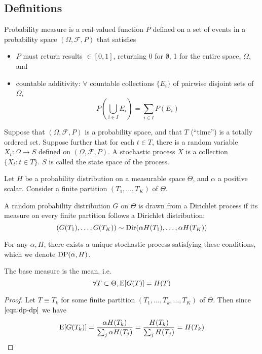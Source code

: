 \subsection{Definitions}
\begin{definition}
	Probability measure is a real-valued function $P$ defined on a set of events in a probability space $(\Omega, \mathcal F, P)$ that satisfies
	\begin{itemize}
		\item $P$ must return results $\in [0, 1]$, returning 0 for $\emptyset$, 1 for the entire space, $\Omega$, and
		\item countable additivity: $\forall$ countable collections $\{E_i\}$ of pairwise disjoint sets of $\Omega$,
			$$P\left(\bigcup_{i \in I} E_i\right) = \sum_{i \in I} P(E_i)$$
	\end{itemize}
\end{definition}

\begin{definition}
	Suppose that $(\Omega, \mathcal F, P)$ is a probability space, and that $T$ (``time'') is a totally ordered set. Suppose further that for each $t \in T$, there is a random variable $X_t: \Omega \to S$ defined on $(\Omega, \mathcal F, P)$. A stochastic process $X$ is a collection $\{X_t: t \in T\}$. $S$ is called the state space of the process.
\end{definition}

\begin{theorem}
	Let $H$ be a probability distribution on a measurable space $\Theta$, and $\alpha$ a positive scalar. Consider a finite partition $(T_1, \dotsc, T_K)$ of $\Theta$.

	A random probability distribution $G$ on $\Theta$ is drawn from a Dirichlet process if its measure on every finite partition follows a Dirichlet distribution:
	\begin{equation}
		(G(T_1), \dotsc, G(T_K)) \sim \operatorname{Dir}(\alpha H(T_1), \dotsc, \alpha H(T_K)) \label{eqn:dp-dp}
	\end{equation}

	For any $\alpha, H$, there exists a unique stochastic process satisfying these conditions, which we denote $\operatorname{DP}(\alpha, H)$.
\end{theorem}

\begin{claim}
	The base measure is the mean, i.e.
	\begin{equation}
		\forall T \subset \Theta, \operatorname{\mathrm{E}}[G(T)] = H(T) \label{eqn:np/dp/def/base}
	\end{equation}
\end{claim}

\begin{proof}
	Let $T \equiv T_k$ for some finite partition $(T_1, \dotsc, T_k, \dotsc, T_K)$ of $\Theta$. Then since $\eqref{eqn:dp-dp}$ we have
	\begin{equation}
		\operatorname{\mathrm{E}}[G(T_k)] = \frac{\alpha H(T_k)}{\sum_j \alpha H(T_j)} = \frac{H(T_k)}{\sum_j H(T_j)} = H(T_k)
	\end{equation}
\end{proof}
